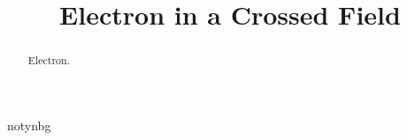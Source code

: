 \documentclass{ximera}
\title{Electron in a Crossed Field}
\begin{document}
\begin{abstract}
Electron.
\end{abstract}
\maketitle

notynbg
\end{document}
